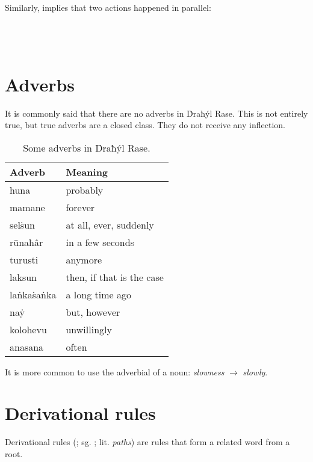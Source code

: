 \documentclass{book}
\begin{document}
Similarly,  implies that two actions happened in parallel: \\
~\\
    \\
    \\
\emph{   }

\chapter{Adverbs}

It is commonly said that there are no adverbs in Ḋraħýl Rase. This is not entirely true, but true adverbs are a closed class. They do not receive any inflection.

\begin{table}[h]
    \caption{Some adverbs in Ḋraħýl Rase.}
    \centering
    \begin{tabular}{|l|l|}
        \hline
        Adverb & Meaning \\
        \hline
        huna & probably \\
        mamane & forever \\
        selṡun & at all, ever, suddenly \\
        rūnaħâr & in a few seconds \\
        turusti & anymore \\
        laksun & then, if that is the case \\
        laṅkaṡaṅka & a long time ago \\
        naẏ & but, however \\
        kolohevu & unwillingly \\
        anasana & often \\
        \hline
    \end{tabular}
\end{table}

It is more common to use the adverbial of a noun:  \emph{slowness} $\rightarrow$  \emph{slowly}.

\chapter{Derivational rules}

Derivational rules (; sg. ; lit. \emph{paths}) are rules that form a related word from a root.
\end{document}
